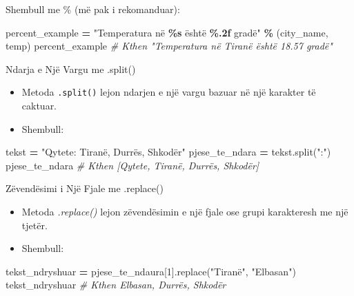 \documentclass[
  ignorenonframetext,
]{beamer}
\newenvironment{Shaded}{\begin{snugshade}}{\end{snugshade}}
\newcommand{\CommentTok}[1]{\textcolor[rgb]{0.56,0.35,0.01}{\textit{#1}}}
\newcommand{\DecValTok}[1]{\textcolor[rgb]{0.00,0.00,0.81}{#1}}
\newcommand{\NormalTok}[1]{#1}
\newcommand{\OperatorTok}[1]{\textcolor[rgb]{0.81,0.36,0.00}{\textbf{#1}}}
\newcommand{\SpecialCharTok}[1]{\textcolor[rgb]{0.81,0.36,0.00}{\textbf{#1}}}
\newcommand{\StringTok}[1]{\textcolor[rgb]{0.31,0.60,0.02}{#1}}
\begin{document}
\begin{frame}[fragile]{Shembull me \% (më pak i rekomanduar):}
\protect\hypertarget{shembull-me-muxeb-pak-i-rekomanduar}{}
\begin{Shaded}
\begin{Highlighting}[]
\NormalTok{percent\_example }\OperatorTok{=} \StringTok{"Temperatura në }\SpecialCharTok{\%s}\StringTok{ është }\SpecialCharTok{\%.2f}\StringTok{ gradë"} \OperatorTok{\%}\NormalTok{ (city\_name, temp)}
\NormalTok{percent\_example  }\CommentTok{\# Kthen "Temperatura në Tiranë është 18.57 gradë"}
\end{Highlighting}
\end{Shaded}
\end{frame}

\begin{frame}[fragile]{Ndarja e Një Vargu me .split()}
\protect\hypertarget{ndarja-e-njuxeb-vargu-me-.split}{}
\begin{itemize}
\item
  Metoda \texttt{.split()} lejon ndarjen e një vargu bazuar në një
  karakter të caktuar.
\item
  Shembull:
\end{itemize}

\begin{Shaded}
\begin{Highlighting}[]
\NormalTok{  tekst }\OperatorTok{=} \StringTok{"Qytete: Tiranë, Durrës, Shkodër"}
\NormalTok{  pjese\_te\_ndara }\OperatorTok{=}\NormalTok{ tekst.split(}\StringTok{":"}\NormalTok{)}
\NormalTok{  pjese\_te\_ndara  }\CommentTok{\# Kthen [\textquotesingle{}Qytete\textquotesingle{}, \textquotesingle{} Tiranë, Durrës, Shkodër\textquotesingle{}]}
\end{Highlighting}
\end{Shaded}
\end{frame}

\begin{frame}[fragile]{Zëvendësimi i Një Fjale me .replace()}
\protect\hypertarget{zuxebvenduxebsimi-i-njuxeb-fjale-me-.replace}{}
\begin{itemize}
\item
  Metoda \emph{.replace()} lejon zëvendësimin e një fjale ose grupi
  karakteresh me një tjetër.
\item
  Shembull:
\end{itemize}

\begin{Shaded}
\begin{Highlighting}[]
\NormalTok{tekst\_ndryshuar }\OperatorTok{=}\NormalTok{ pjese\_te\_ndaura[}\DecValTok{1}\NormalTok{].replace(}\StringTok{"Tiranë"}\NormalTok{, }\StringTok{"Elbasan"}\NormalTok{)}
\NormalTok{tekst\_ndryshuar  }\CommentTok{\# Kthen \textquotesingle{} Elbasan, Durrës, Shkodër\textquotesingle{}}
\end{Highlighting}
\end{Shaded}
\end{frame}
\end{document}
